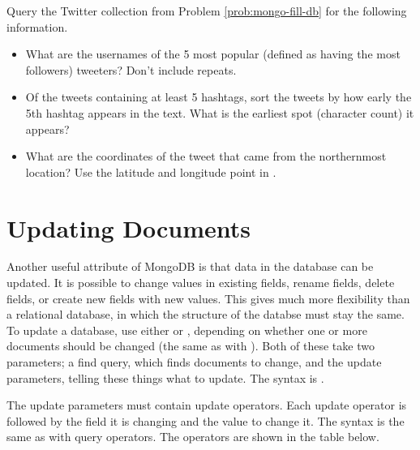 \begin{problem}
Query the Twitter collection from Problem \ref{prob:mongo-fill-db} for the following information.
\begin{itemize}
    \item What are the usernames of the 5 most popular (defined as having the most followers) tweeters? Don't include repeats.
    \item Of the tweets containing at least 5 hashtags, sort the tweets by how early the 5th hashtag appears in the text.
    What is the earliest spot (character count) it appears?
    \item What are the coordinates of the tweet that came from the northernmost location?
    Use the latitude and longitude point in .
\end{itemize}
\end{problem}

\section*{Updating Documents}

Another useful attribute of MongoDB is that data in the database can be updated. It is possible to change values in existing fields, rename fields, delete fields, or create new fields with new values. This gives much more flexibility than a relational database, in which the structure of the databse must stay the same. To update a database, use either  or , depending on whether one or more documents should be changed (the same as with ). Both of these take two parameters;  a find query, which finds documents to change, and the update parameters, telling these things what to update. The syntax is .

The update parameters must contain update operators. Each update operator is followed by the field it is changing and the value to change it. The syntax is the same as with query operators. The operators are shown in the table below.

